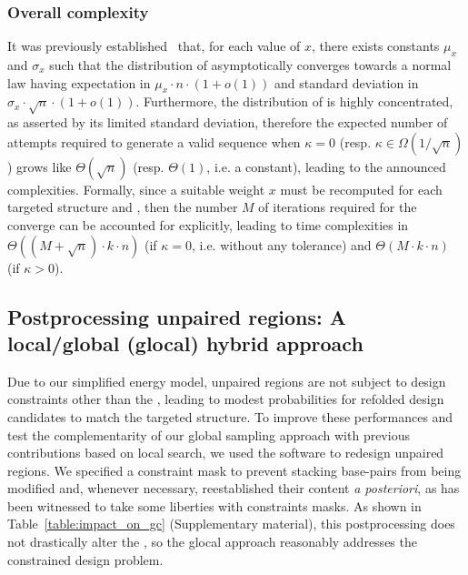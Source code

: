 \subsubsection{Overall complexity}

It was previously established~\citep{Waldispuhl2011} that, for each value of $x$, there exists constants $\mu_x$ and $\sigma_x$ such that the distribution of \GCContent asymptotically converges towards a normal law having expectation in $\mu_x\cdot n\cdot(1+o(1))$ and standard deviation in $\sigma_x\cdot\sqrt{n}\cdot(1+o(1))$.
Furthermore, the distribution of \GCContent is highly concentrated, as asserted by its limited standard deviation, therefore the expected number of attempts required to generate a valid sequence when $\kappa=0$ (resp. $\kappa\in\Omega(1/\sqrt n)$) grows like $\Theta(\sqrt{n})$ (resp. $\Theta(1)$, i.e. a constant), leading to the announced complexities. Formally, since a suitable weight $x$ must be recomputed for each targeted structure and \GCContent, then the number $M$ of iterations required for the converge can be accounted for explicitly, leading to time complexities in $\Theta((M+\sqrt{n})\cdot k\cdot n)$ (if $\kappa=0$, i.e. without any tolerance) and $\Theta(M\cdot k\cdot n)$ (if $\kappa>0$).



\subsection{Postprocessing unpaired regions: A local/global (glocal) hybrid approach}
\label{subsec:glocal_method}
Due to our simplified energy model, unpaired regions are not subject to design constraints other than the \GCContent, leading to modest probabilities for refolded design candidates to match the targeted structure. To improve these performances and test the complementarity  of our global sampling approach with previous contributions based on local search, we used the \RNAinverse software to redesign unpaired regions. We specified a constraint mask to prevent stacking base-pairs from being modified and, whenever necessary, reestablished their content {\em a posteriori}, as \RNAinverse has been witnessed to take some liberties with constraints masks. As shown in Table~\ref{table:impact_on_gc} (Supplementary material), this postprocessing does not drastically alter the \GCContent, so the glocal approach reasonably addresses the constrained \GCContent design problem.


